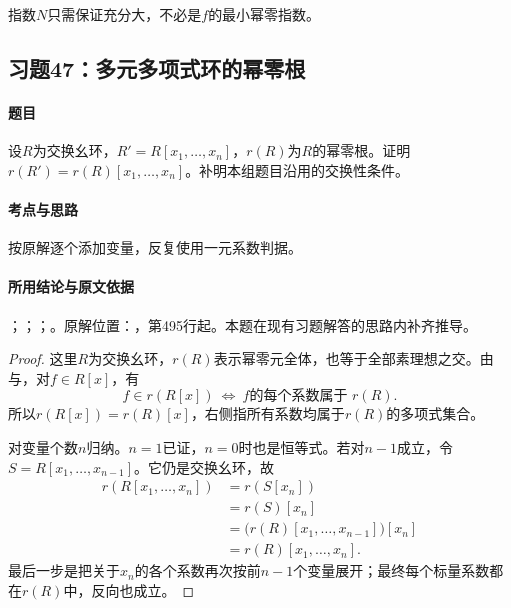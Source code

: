 指数$N$只需保证充分大，不必是$f$的最小幂零指数。



\subsection{习题47：多元多项式环的幂零根}

\label{ex:3:47}

\paragraph{题目}

设$R$为交换幺环，$R'=R[x_1,\ldots,x_n]$，$r(R)$为$R$的幂零根。证明$r(R')=r(R)[x_1,\ldots,x_n]$。补明本组题目沿用的交换性条件。

\paragraph{考点与思路}

按原解逐个添加变量，反复使用一元系数判据。

\paragraph{所用结论与原文依据}

；；；。原解位置：，第495行起。本题在现有习题解答的思路内补齐推导。


\begin{proof}

这里$R$为交换幺环，$r(R)$表示幂零元全体，也等于全部素理想之交。由与，对$f\in R[x]$，有
\[
f\in r(R[x])\ \Longleftrightarrow\ f\text{的每个系数属于 }r(R).
\]
所以$r(R[x])=r(R)[x]$，右侧指所有系数均属于$r(R)$的多项式集合。

对变量个数$n$归纳。$n=1$已证，$n=0$时也是恒等式。若对$n-1$成立，令$S=R[x_1,\ldots,x_{n-1}]$。它仍是交换幺环，故
\begin{align*}
r(R[x_1,\ldots,x_n])
&=r(S[x_n])\\
&=r(S)[x_n]\\
&=\bigl(r(R)[x_1,\ldots,x_{n-1}]\bigr)[x_n]\\
&=r(R)[x_1,\ldots,x_n].
\end{align*}
最后一步是把关于$x_n$的各个系数再次按前$n-1$个变量展开；最终每个标量系数都在$r(R)$中，反向也成立。

\end{proof}

